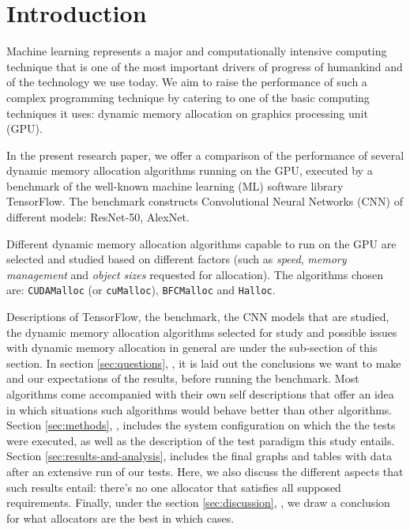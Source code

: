 \documentclass[12pt,twoside]{article}
\begin{document}

\section{Introduction}
\label{sec:introduction}

Machine learning represents a major and computationally intensive computing technique that is one of the most important drivers of progress of humankind and of the technology we use today. We aim to raise the performance of such a complex programming technique by catering to one of the basic computing techniques it uses: dynamic memory allocation on graphics processing unit (GPU).

In the present research paper, we offer a comparison of the performance of several dynamic memory allocation algorithms running on the GPU, executed by a benchmark of the well-known machine learning (ML) software library TensorFlow. The benchmark constructs Convolutional Neural Networks (CNN) of different models: ResNet-50, AlexNet.

Different dynamic memory allocation algorithms capable to run on the GPU are selected and studied based on different factors (such as \textit{speed}, \textit{memory management} and \textit{object sizes} requested for allocation). The algorithms chosen are: \texttt{CUDAMalloc} (or \texttt{cuMalloc}), \texttt{BFCMalloc} and \texttt{Halloc}.

Descriptions of TensorFlow, the benchmark, the CNN models that are studied, the dynamic memory allocation algorithms selected for study and possible issues with dynamic memory allocation in general are under the sub-section \textit{} of this \textit{} section. In section \ref{sec:questions}, \textit{}, it is laid out the conclusions we want to make and our expectations of the results, before running the benchmark. Most algorithms come accompanied with their own self descriptions that offer an idea in which situations such algorithms would behave better than other algorithms. Section \ref{sec:methods}, \textit{}, includes the system configuration on which the the tests were executed, as well as the description of the test paradigm this study entails. Section \ref{sec:results-and-analysis}, \textit{} includes the final graphs and tables with data after an extensive run of our tests. Here, we also discuss the different aspects that such results entail: there's no one allocator that satisfies all supposed requirements. Finally, under the section \ref{sec:discussion}, \textit{}, we draw a conclusion for what allocators are the best in which cases.
\end{document}
